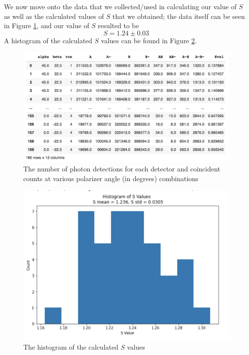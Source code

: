 \documentclass[twocolumn,amsmath,amssymb,pra]{revtex4-2}
\begin{document}
We now move onto the data that we collected/used in calculating our value of $S$ as well as the calculated values of $S$ that we obtained; the data itself can be seen in Figure \ref{fig:S_data}, and our value of $S$ resulted to be 
\begin{equation}
    S
    =
    1.24 \pm 0.03
    \label{eq:S_value}
\end{equation}
A histogram of the calculated $S$ values can be found in Figure \ref{fig:S_hist}.

\begin{figure}
    \centering
    \includegraphics[width = 0.95 \linewidth]{S_data.png}
    \caption{The number of photon detections for each detector and coincident counts at various polarizer angle (in degrees) combinations}
    \label{fig:S_data}
\end{figure}

\begin{figure}
    \centering
    \includegraphics[width = 0.95 \linewidth]{s_hist.png}
    \caption{The histogram of the calculated $S$ values}
    \label{fig:S_hist}
\end{figure}
\end{document}
